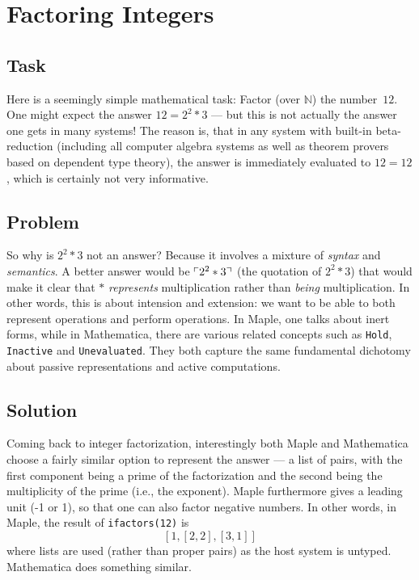 \documentclass[fleqn]{llncs}
\newcommand{\NN}{\ensuremath{\mathbb{N}}}
\begin{document}
\section{Factoring Integers}\label{sec:factoring}

\subsection{Task}

Here is a seemingly simple mathematical task: Factor (over $\NN$)
the number~$12$.  One might expect the answer $12 = 2^2 * 3$ ---
but this is not actually the answer one gets in many systems!  The reason
is, that in any system with built-in beta-reduction (including all
computer algebra systems as well as theorem provers based on dependent
type theory), the answer is immediately evaluated to \mbox{$12 = 12$}, which is
certainly not very informative.

\subsection{Problem}

So why is $2^2 * 3$ not an answer? Because it involves a mixture of
\emph{syntax} and \emph{semantics}. A better answer would be
$\ulcorner2^2 * 3\urcorner$ (the quotation of $2^2 * 3$) that would
make it clear that $*$ \emph{represents} multiplication
rather than \emph{being} multiplication. In other words, this is about
intension and extension: we want to be able to both represent
operations and perform operations. In Maple, one talks about
\textsf{inert forms}, while in Mathematica, there are various related
concepts such as \texttt{Hold}, \texttt{Inactive} and
\texttt{Unevaluated}.  They both capture the same fundamental
dichotomy about passive representations and active computations.

\subsection{Solution}

Coming back to integer factorization, interestingly both Maple and
Mathematica choose a fairly similar option to represent the answer ---
a list of pairs, with the first component being a prime of the
factorization and the second being the multiplicity of the
prime (i.e., the exponent).  Maple furthermore gives a leading unit
(-1 or 1), so that one can also factor negative numbers. In other
words, in Maple, the result of \texttt{ifactors(12)} is
\[ \left[ 1, \left[2,2\right], \left[3,1\right]\right] \]
where lists are used (rather than proper pairs) as the host system is
untyped.  Mathematica does something similar.
\end{document}
